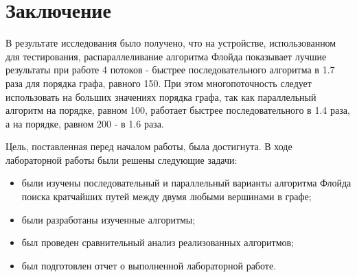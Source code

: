 \chapter*{Заключение}

В результате исследования было получено, что на устройстве, использованном для тестирования, распараллеливание алгоритма Флойда показывает лучшие результаты при работе 4 потоков - быстрее последовательного алгоритма в 1.7 раза для порядка графа, равного 150. При этом многопоточность следует использовать на больших значениях порядка графа, так как параллельный алгоритм на порядке, равном 100, работает быстрее последовательного в 1.4 раза, а на порядке, равном 200 - в 1.6 раза.

Цель, поставленная перед началом работы, была достигнута. В ходе лабораторной работы были решены следующие задачи:

\begin{itemize}
	\item были изучены последовательный и параллельный варианты алгоритма Флойда поиска кратчайших путей между двумя любыми вершинами в графе;
	\item были разработаны изученные алгоритмы;
	\item был проведен сравнительный анализ реализованных алгоритмов;
	\item был подготовлен отчет о выполненной лабораторной работе.
\end{itemize}
